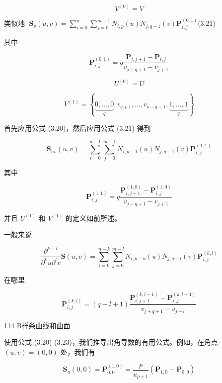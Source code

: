 \documentclass[../main.tex]{subfiles}
\begin{document}
\[
{V}^{\left( 0\right) } = V
\]

类似地 \(\;{\mathbf{S}}_{v}\left( {u,v}\right)  = \mathop{\sum }\limits_{{i = 0}}^{n}\mathop{\sum }\limits_{{j = 0}}^{{m - 1}}{N}_{i,p}\left( u\right) {N}_{j,q - 1}\left( v\right) {\mathbf{P}}_{i,j}^{\left( 0,1\right) }\)(3.21)

其中

\[
{\mathbf{P}}_{i,j}^{\left( 0,1\right) } = q\frac{{\mathbf{P}}_{i,j + 1} - {\mathbf{P}}_{i,j}}{{v}_{j + q + 1} - {v}_{j + 1}}
\]

\[
{U}^{\left( 0\right) } = U
\]

\[
{V}^{\left( 1\right) } = \left\{  {\underset{q}{\underbrace{0,\ldots ,0}},{v}_{q + 1},\ldots ,{v}_{s - q - 1},\underset{q}{\underbrace{1,\ldots ,1}}}\right\}
\]

首先应用公式 (3.20)，然后应用公式 (3.21) 得到

\[
{\mathbf{S}}_{uv}\left( {u,v}\right)  = \mathop{\sum }\limits_{{i = 0}}^{{n - 1}}\mathop{\sum }\limits_{{j = 0}}^{{m - 1}}{N}_{i,p - 1}\left( u\right) {N}_{j,q - 1}\left( v\right) {\mathbf{P}}_{i,j}^{\left( 1,1\right) } \tag{3.22}
\]

其中

\[
{\mathbf{P}}_{i,j}^{\left( 1,1\right) } = q\frac{{\mathbf{P}}_{i,j + 1}^{\left( 1,0\right) } - {\mathbf{P}}_{i,j}^{\left( 1,0\right) }}{{v}_{j + q + 1} - {v}_{j + 1}}
\]

并且 \({U}^{\left( 1\right) }\) 和 \({V}^{\left( 1\right) }\) 的定义如前所述。

一般来说

\[
\frac{{\partial }^{k + l}}{{\partial }^{k}u{\partial }^{l}v}\mathbf{S}\left( {u,v}\right)  = \mathop{\sum }\limits_{{i = 0}}^{{n - k}}\mathop{\sum }\limits_{{j = 0}}^{{m - l}}{N}_{i,p - k}\left( u\right) {N}_{j,q - l}\left( v\right) {\mathbf{P}}_{i,j}^{\left( k,l\right) } \tag{3.23}
\]

在哪里

\[
{\mathbf{P}}_{i,j}^{\left( k,l\right) } = \left( {q - l + 1}\right) \frac{{\mathbf{P}}_{i,j + 1}^{\left( k,l - 1\right) } - {\mathbf{P}}_{i,j}^{\left( k,l - 1\right) }}{{v}_{j + q + 1} - {v}_{j + l}}
\]

114 B样条曲线和曲面

使用公式 (3.20)-(3.23)，我们推导出角导数的有用公式。例如，在角点 \(\left( {u,v}\right)  = \left( {0,0}\right)\) 处，我们有

\[
{\mathbf{S}}_{u}\left( {0,0}\right)  = {\mathbf{P}}_{0,0}^{\left( 1,0\right) } = \frac{p}{{u}_{p + 1}}\left( {{\mathbf{P}}_{1,0} - {\mathbf{P}}_{0,0}}\right)
\]
\end{document}
